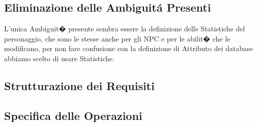 \documentclass[12pt]{article} %
\begin{document}
		\subsection{Eliminazione delle Ambiguit\'{a} Presenti}

		L'unica Ambiguit� presente sembra essere la definizione delle Statistiche del personaggio, che sono le stesse anche per gli NPC e per le abilit� che le modificano, per non fare confusione con la definizione di Attributo dei database abbiamo scelto di usare Statistiche.



		\subsection{Strutturazione dei Requisiti}

		

		\subsection{Specifica delle Operazioni}

		
\end{document}
